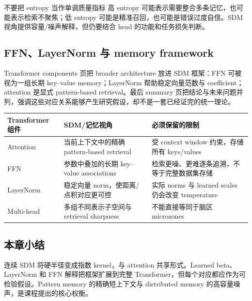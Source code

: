 \begin{warningbox}{不要把 entropy 当作单调质量指标}
高 entropy 可能表示需要整合多条记忆，也可能表示检索不聚焦；低 entropy 可能是精准召回，也可能是错误过度自信。SDM 视角提供容量/噪声解释，但仍要结合 head 的功能和任务损失判断。
\end{warningbox}

\subsection{FFN、LayerNorm 与 memory framework}

Transformer components 页把 broader architecture 放进 SDM 框架：FFN 可被视为一组长期 key--value memory；LayerNorm 帮助稳定向量范数与 coefficient；attention 是显式 pattern-based retrieval。最后 summary 页把结论与未来问题并列，强调这些对应关系能够产生研究假设，却不是一套已经证完的统一理论。



\begin{longtable}{@{}L{0.20\textwidth}L{0.31\textwidth}L{0.37\textwidth}@{}}
\toprule
Transformer 组件 & SDM/记忆视角 & 必须保留的限制 \\
\midrule
Attention & 当前上下文中的精确 pattern-based retrieval & 受 context window 约束，存储所有 keys/values \\
FFN & 参数中叠加的长期 key--value associations & 检索更噪、更难逐条追溯，不等于完整数据集存储 \\
LayerNorm & 稳定向量 norm，使距离/点积对应更可控 & 实际 norms 与 learned scales 仍会改变 temperature \\
Multi-head & 多组不同表示子空间与 retrieval sharpness & 不能直接等同于脑区 microzones \\
\bottomrule
\end{longtable}


\subsection{本章小结}

连续 SDM 将硬半径变成指数 kernel，与 attention 共享形式。Learned beta、LayerNorm 和 FFN 解释把框架扩展到完整 Transformer，但每个对应都应作为可检验假设。Pattern memory 的精确短上下文与 distributed memory 的高容量噪声，是课程提出的核心权衡。

